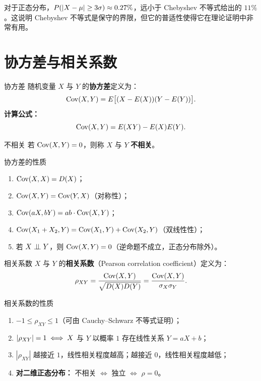 \begin{remark}
对于正态分布，$P(\left|X - \mu\right| \geq 3\sigma) \approx 0.27\%$，远小于 Chebyshev 不等式给出的 $11\%$。这说明 Chebyshev 不等式是保守的界限，但它的普适性使得它在理论证明中非常有用。
\end{remark}

\section{协方差与相关系数}

\begin{mydefinition}{协方差}
	随机变量 $X$ 与 $Y$ 的\textbf{协方差}定义为：
	\[\mathrm{Cov}(X, Y) = E\bigl[(X - E(X))(Y - E(Y))\bigr].\]
	\textbf{计算公式：}
	\[\mathrm{Cov}(X, Y) = E(XY) - E(X)E(Y).\]
\end{mydefinition}

\begin{mydefinition}{不相关}
	若 $\mathrm{Cov}(X, Y) = 0$，则称 $X$ 与 $Y$ \textbf{不相关}。
\end{mydefinition}

\begin{myproperty}{协方差的性质}
\begin{enumerate}
	\item $\mathrm{Cov}(X, X) = D(X)$；
	\item $\mathrm{Cov}(X, Y) = \mathrm{Cov}(Y, X)$（对称性）；
	\item $\mathrm{Cov}(aX, bY) = ab \cdot \mathrm{Cov}(X, Y)$；
	\item $\mathrm{Cov}(X_1 + X_2, Y) = \mathrm{Cov}(X_1, Y) + \mathrm{Cov}(X_2, Y)$（双线性性）；
	\item 若 $X \perp\!\!\!\perp Y$，则 $\mathrm{Cov}(X, Y) = 0$（逆命题不成立，正态分布除外）。
\end{enumerate}
\end{myproperty}

\begin{mydefinition}{相关系数}
	$X$ 与 $Y$ 的\textbf{相关系数}（Pearson correlation coefficient）定义为：
	\[\rho_{XY} = \frac{\mathrm{Cov}(X, Y)}{\sqrt{D(X) D(Y)}} = \frac{\mathrm{Cov}(X, Y)}{\sigma_X \sigma_Y}.\]
\end{mydefinition}

\begin{myproperty}{相关系数的性质}
\begin{enumerate}
	\item $-1 \leq \rho_{XY} \leq 1$（可由 Cauchy--Schwarz 不等式证明）；
	\item $\left|\rho_{XY}\right| = 1 \iff X$ 与 $Y$ 以概率 $1$ 存在线性关系 $Y = aX + b$；
	\item $|\rho_{XY}|$ 越接近 $1$，线性相关程度越高；越接近 $0$，线性相关程度越低；
	\item \textbf{对二维正态分布：} 不相关 $\iff$ 独立 $\iff$ $\rho = 0$。
\end{enumerate}
\end{myproperty}

